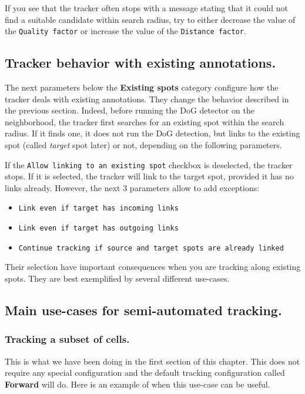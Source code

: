 \noindent If you see that the tracker often stops with a message stating that it could not find a suitable candidate within search radius, try to either decrease  the value of the \texttt{Quality factor} or increase the value of the \texttt{Distance factor}.

\subsection{Tracker behavior with existing annotations.}

The next parameters below the \textbf{Existing spots} category configure how the tracker deals with existing annotations.
They change the behavior described in the previous section.
Indeed, before running the DoG detector on the neighborhood, the tracker first searches for an existing spot within the search radius. 
If it finds one, it does not run the DoG detection, but links to the existing spot (called \textit{target} spot later) or not, depending on the following parameters.

If the \texttt{Allow linking to an existing spot} checkbox is deselected, the tracker stops. 
If it is selected, the tracker will link to the target spot, provided it has no links already. 
However, the next 3 parameters allow to add exceptions: 

\begin{itemize}
    \item \texttt{Link even if target has incoming links}
    \item \texttt{Link even if target has outgoing links}
    \item \texttt{Continue tracking if source and target spots are already linked}
\end{itemize}

\noindent Their selection have important consequences when you are tracking along existing spots.
They are best exemplified by several different use-cases.

\subsection{Main use-cases for semi-automated tracking.}

\subsubsection{Tracking a subset of cells. }

This is what we have been doing in the first section of this chapter. 
This does not require any special configuration and the default tracking configuration called \textbf{Forward} will do.
Here is an example of when this use-case can be useful.

